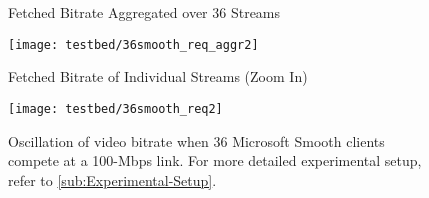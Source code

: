 \documentclass[conference]{IEEEtran}
\theoremstyle{plain}
\theoremstyle{definition}
\theoremstyle{plain}
\theoremstyle{plain}
\begin{document}
\begin{figure}
\begin{centering}
\hspace{-0.3in} \begin{minipage}[t]{1\columnwidth}\begin{center}
\hspace{0.2in}\footnotesize Fetched Bitrate Aggregated over 36 Streams\vspace{-0.23in}

\par\end{center}

\begin{center}
\texttt{[image: testbed/36smooth\_req\_aggr2]}
\par\end{center}\end{minipage}
\par\end{centering}

\begin{centering}
\vspace{0.05in}
\hspace{-0.3in} \begin{minipage}[t]{1\columnwidth}\begin{center}
\hspace{0.2in}\footnotesize Fetched Bitrate of Individual Streams
(Zoom In)\vspace{-0.23in}

\par\end{center}

\begin{center}
\texttt{[image: testbed/36smooth\_req2]}
\par\end{center}\end{minipage}
\par\end{centering}

\begin{centering}
\vspace{0in}

\par\end{centering}

\centering{}\caption{Oscillation of video bitrate when 36 Microsoft Smooth clients compete
at a 100-Mbps link. For more detailed experimental setup, refer to
\ref{sub:Experimental-Setup}. }


\label{Flo:36smooth} \vspace{-0.15in}
\end{figure}
\end{document}
